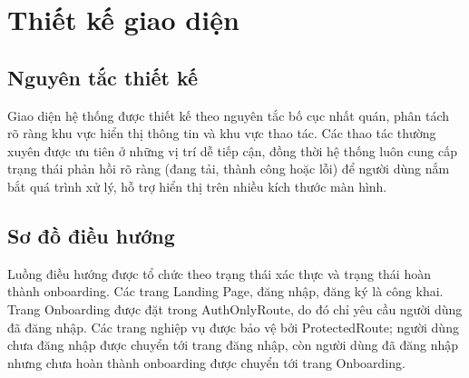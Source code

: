 \documentclass[12pt, a4paper]{report}
\begin{document}
\section{Thiết kế giao diện}
\subsection{Nguyên tắc thiết kế}
Giao diện hệ thống được thiết kế theo nguyên tắc bố cục nhất quán, phân tách rõ ràng khu vực hiển thị thông tin và khu vực thao tác. Các thao tác thường xuyên được ưu tiên ở những vị trí dễ tiếp cận, đồng thời hệ thống luôn cung cấp trạng thái phản hồi rõ ràng (đang tải, thành công hoặc lỗi) để người dùng nắm bắt quá trình xử lý, hỗ trợ hiển thị trên nhiều kích thước màn hình.

\subsection{Sơ đồ điều hướng}
Luồng điều hướng được tổ chức theo trạng thái xác thực và trạng thái hoàn thành onboarding. Các trang Landing Page, đăng nhập, đăng ký là công khai. Trang Onboarding được đặt trong AuthOnlyRoute, do đó chỉ yêu cầu người dùng đã đăng nhập. Các trang nghiệp vụ được bảo vệ bởi ProtectedRoute; người dùng chưa đăng nhập được chuyển tới trang đăng nhập, còn người dùng đã đăng nhập nhưng chưa hoàn thành onboarding được chuyển tới trang Onboarding.
\end{document}

